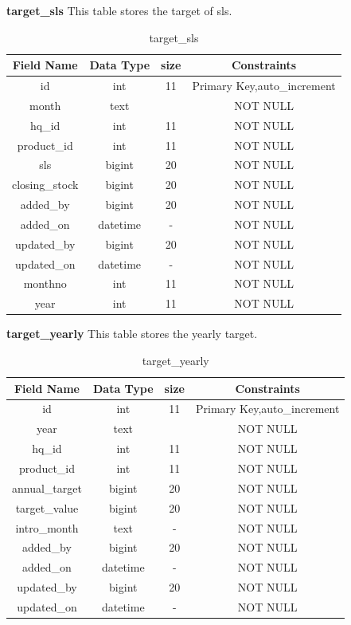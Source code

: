 \textbf{target\_sls} This table stores the  target of sls.\nolinebreak
\begin{table}[hp]
\centering
\begin{tabular}{|c|c|c|c|}
\hline
\textbf{Field Name}  & \textbf{Data Type}  & \textbf{size} &\textbf{Constraints}  \\
\hline
id &	int	 & 11 & Primary Key,auto\_increment \\\hline
month &	text &	 & NOT NULL \\\hline
hq\_id &	int &	11 & NOT NULL \\\hline
product\_id &	int &	11 & NOT NULL \\\hline
sls &	bigint &	20 & NOT NULL \\\hline
closing\_stock &	bigint &	20 & NOT NULL \\\hline
added\_by &	bigint &	20 & NOT NULL \\\hline
added\_on &	datetime &	- & NOT NULL \\\hline
updated\_by &	bigint &	20 & NOT NULL \\\hline
updated\_on &	datetime &	- & NOT NULL \\\hline
monthno &	int &	11 & NOT NULL \\\hline
year &	int &	11 & NOT NULL \\\hline

 
\end{tabular}
\caption{target\_sls}
\end{table}

\pagebreak

\textbf{target\_yearly} This table stores the  yearly target.\nolinebreak
\begin{table}[hp]
\centering
\begin{tabular}{|c|c|c|c|}
\hline
\textbf{Field Name}  & \textbf{Data Type}  & \textbf{size} &\textbf{Constraints}  \\
\hline
id &	int &	11 & Primary Key,auto\_increment \\\hline
year &	  text &	 & NOT NULL \\\hline
hq\_id &	int &	11 & NOT NULL \\\hline
product\_id &	int &	11 & NOT NULL \\\hline
annual\_target &	bigint &	20 & NOT NULL \\\hline
target\_value	& bigint &	20 & NOT NULL \\\hline
intro\_month &	text &	- & NOT NULL \\\hline
added\_by &	bigint &	20 & NOT NULL \\\hline
added\_on &	datetime &	- & NOT NULL \\\hline
updated\_by &	bigint &	20 & NOT NULL \\\hline
updated\_on &	datetime &	- & NOT NULL \\\hline
 
\end{tabular}
\caption{target\_yearly}
\end{table}

